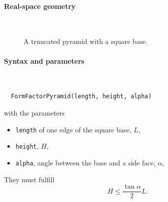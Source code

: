 \label{SPyramid}

\paragraph{Real-space geometry}\strut\\

\begin{figure}[H]
\hfill
{}
\hfill
{}
\hfill
{}
\hfill
\caption{A truncated pyramid with a square base.}
\end{figure}

\FloatBarrier

\paragraph{Syntax and parameters}\strut\\[-2ex plus .2ex minus .2ex]
\begin{lstlisting}
  FormFactorPyramid(length, height, alpha)
\end{lstlisting}
with the parameters
\begin{itemize}
\item \texttt{length} of one edge of the square base, $L$,
\item \texttt{height}, $H$,
\item \texttt{alpha}, angle between the base and a side face, $\alpha$,
\end{itemize}
They must fulfill
\begin{displaymath}
  H \le \frac{\tan\alpha}{2}L.
\end{displaymath}

